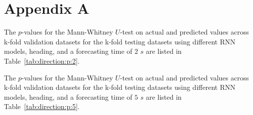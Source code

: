 \appendix
\section{Appendix A}
\label{appA}

The $p$-values for the Mann-Whitney $U$-test on actual and predicted values across k-fold validation datasets for the k-fold testing datasets using different RNN models, heading, and a forecasting time of $2$ $s$ are listed in Table~\ref{tab:direction:p:2}.

\begin{table}[!ht]
	\centering
	\caption{The $p$-values for the Mann-Whitney $U$-test on actual and predicted values across k-fold validation datasets for the k-fold testing datasets using different RNN models, heading, and a forecasting time of $2$ $s$.}
	\label{tab:direction:p:2}
\end{table}

The $p$-values for the Mann-Whitney $U$-test on actual and predicted values across k-fold validation datasets for the k-fold testing datasets using different RNN models, heading, and a forecasting time of $5$ $s$ are listed in Table~\ref{tab:direction:p:5}.

